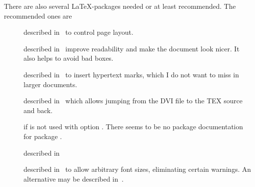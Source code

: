 There are also several \LaTeX-packages needed or at least recommended. 
The recommended ones are 
%
\begin{description}
\item[] described in~\cite{GeomP} 
to control page layout. 
\item[] described in~\cite{MicroTyP} improve readability 
and make the document look nicer. 
It also helps to avoid bad boxes. 
\item[] described in~\cite{HyperTextP} 
to insert hypertext marks, which I do not want to miss in larger documents. 
\item[] described in~\cite{SrcLtxP} 
which allows jumping from the DVI file to the TEX source and back.
\item[] 
if  is not used with option . 
There seems to be no package documentation for package . 
\item[] described in~\cite{BooktP} 

\item[] described in~\cite{AnyfontsizeP} 
to allow arbitrary font sizes, eliminating certain warnings. 
An alternative may be  described in~\cite{FixCmP}. 
\end{description}

